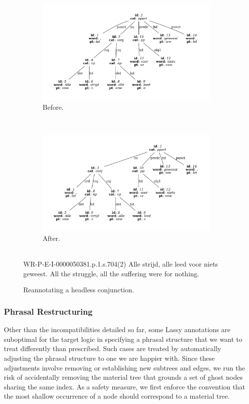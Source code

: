 \begin{figure}
	\centering
	\begin{subfigure}[b]{0.85\textwidth}
		\includegraphics[width=1\textwidth,trim={1.5cm 1.5cm 1.5cm 1.5cm}]{./prebuilt/p2crd_before.pdf}
		\caption{Before.}
	\end{subfigure}\\[\midsep]
	\begin{subfigure}[b]{0.85\textwidth}
			\includegraphics[width=1\textwidth,trim={1.5cm 1.5cm 1.5cm 1.5cm}]{./prebuilt/p2crd_after.pdf}
			\caption{After.}			
	\end{subfigure}\\[\smallsep]
	\lassycap
		{WR-P-E-I-0000050381.p.1.s.704(2)}
		{Alle strijd, alle leed voor niets geweest.}
		{All the struggle, all the suffering were for nothing.}
	\caption{Reannotating a headless conjunction.}
	\label{figure:p2crd}
\end{figure}

\subsubsection{Phrasal Restructuring}
Other than the incompatibilities detailed so far, some Lassy annotations are suboptimal for the target logic in specifying a phrasal structure that we want to treat differently than prescribed.
Such cases are treated by automatically adjusting the phrasal structure to one we are happier with.
Since these adjustments involve removing or establishing new subtrees and edges, we run the risk of accidentally removing the material tree that grounds a set of ghost nodes sharing the same index.
As a safety measure, we first enforce the convention that the most shallow occurrence of a node should correspond to a material tree.

